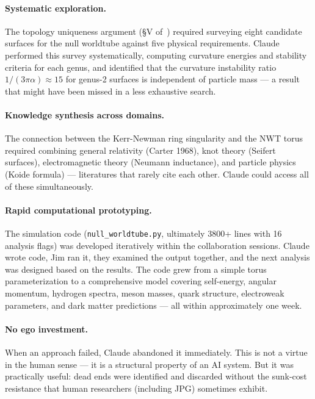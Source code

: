 \documentclass[11pt,a4paper]{article}
\begin{document}
\paragraph{Systematic exploration.}
The topology uniqueness argument (\S V of~\cite{paper2}) required surveying eight candidate surfaces for the null worldtube against five physical requirements. Claude performed this survey systematically, computing curvature energies and stability criteria for each genus, and identified that the curvature instability ratio $1/(3\pi\alpha) \approx 15$ for genus-2 surfaces is independent of particle mass --- a result that might have been missed in a less exhaustive search.

\paragraph{Knowledge synthesis across domains.}
The connection between the Kerr-Newman ring singularity and the NWT torus required combining general relativity (Carter 1968), knot theory (Seifert surfaces), electromagnetic theory (Neumann inductance), and particle physics (Koide formula) --- literatures that rarely cite each other. Claude could access all of these simultaneously.

\paragraph{Rapid computational prototyping.}
The simulation code (\texttt{null\_worldtube.py}, ultimately 3800+ lines with 16 analysis flags) was developed iteratively within the collaboration sessions. Claude wrote code, Jim ran it, they examined the output together, and the next analysis was designed based on the results. The code grew from a simple torus parameterization to a comprehensive model covering self-energy, angular momentum, hydrogen spectra, meson masses, quark structure, electroweak parameters, and dark matter predictions --- all within approximately one week.

\paragraph{No ego investment.}
When an approach failed, Claude abandoned it immediately. This is not a virtue in the human sense --- it is a structural property of an AI system. But it was practically useful: dead ends were identified and discarded without the sunk-cost resistance that human researchers (including JPG) sometimes exhibit.
\end{document}
